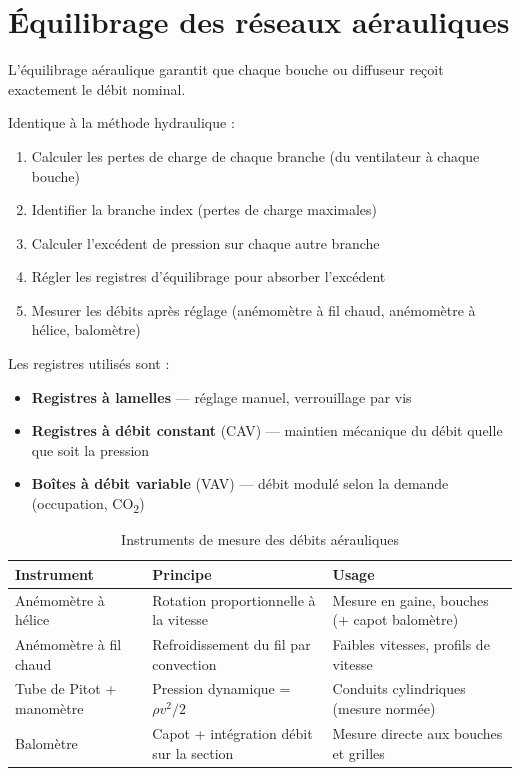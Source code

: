 \section{Équilibrage des réseaux aérauliques}

L'équilibrage aéraulique garantit que chaque bouche ou diffuseur reçoit exactement le débit nominal.

\begin{methode}[title=Méthode de la branche index (aéraulique)]
Identique à la méthode hydraulique :
\begin{enumerate}
  \item Calculer les pertes de charge de chaque branche (du ventilateur à chaque bouche)
  \item Identifier la branche index (pertes de charge maximales)
  \item Calculer l'excédent de pression sur chaque autre branche
  \item Régler les registres d'équilibrage pour absorber l'excédent
  \item Mesurer les débits après réglage (anémomètre à fil chaud, anémomètre à hélice, balomètre)
\end{enumerate}

Les registres utilisés sont :
\begin{itemize}
  \item \textbf{Registres à lamelles} — réglage manuel, verrouillage par vis
  \item \textbf{Registres à débit constant} (CAV) — maintien mécanique du débit quelle que soit la pression
  \item \textbf{Boîtes à débit variable} (VAV) — débit modulé selon la demande (occupation, CO\textsubscript{2})
\end{itemize}
\end{methode}

\begin{table}[H]
  \centering
  \caption{Instruments de mesure des débits aérauliques}
  \begin{tabular}{p{3.5cm}p{4cm}p{4.5cm}}
    \toprule
    Instrument & Principe & Usage \\
    \midrule
    Anémomètre à hélice & Rotation proportionnelle à la vitesse & Mesure en gaine, bouches (+ capot balomètre) \\
    Anémomètre à fil chaud & Refroidissement du fil par convection & Faibles vitesses, profils de vitesse \\
    Tube de Pitot + manomètre & Pression dynamique = $\rho v^2/2$ & Conduits cylindriques (mesure normée) \\
    Balomètre & Capot + intégration débit sur la section & Mesure directe aux bouches et grilles \\
    \bottomrule
  \end{tabular}
\end{table}

